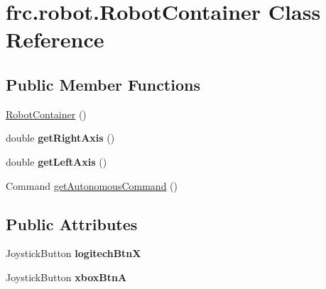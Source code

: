 \hypertarget{classfrc_1_1robot_1_1_robot_container}{}\section{frc.\+robot.\+Robot\+Container Class Reference}
\label{classfrc_1_1robot_1_1_robot_container}
\subsection*{Public Member Functions}
\begin{DoxyCompactItemize}
\item 
\mbox{\hyperlink{classfrc_1_1robot_1_1_robot_container_ab0ea038f5ce3328722a60e0823f51887}{Robot\+Container}} ()
\item 
\mbox{\label{classfrc_1_1robot_1_1_robot_container_a229beacbeb0370866dd1aa11d099319b}} 
double {\bfseries get\+Right\+Axis} ()
\item 
\mbox{\label{classfrc_1_1robot_1_1_robot_container_a45b75fb514d6c0f32f497ff72c61526e}} 
double {\bfseries get\+Left\+Axis} ()
\item 
Command \mbox{\hyperlink{classfrc_1_1robot_1_1_robot_container_ac61d2476e65873e263f844c1c721a82e}{get\+Autonomous\+Command}} ()
\end{DoxyCompactItemize}
\subsection*{Public Attributes}
\begin{DoxyCompactItemize}
\item 
\mbox{\label{classfrc_1_1robot_1_1_robot_container_a43354713fae02d484d390f742bc63387}} 
Joystick\+Button {\bfseries logitech\+BtnX}
\item 
\mbox{\label{classfrc_1_1robot_1_1_robot_container_a05cca97fcb655084b3761e8790d374b1}} 
Joystick\+Button {\bfseries xbox\+BtnA}
\end{DoxyCompactItemize}
